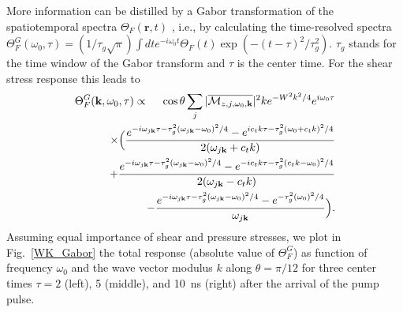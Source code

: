 \documentclass[aps,prb,twocolumn,superscriptaddress,floatfix]{revtex4}%
\def\ber{\begin{eqnarray}}
\def\eer{\end{eqnarray}}
\begin{document}
More information can be distilled by a  Gabor transformation of the spatiotemporal spectra $\Theta_F(\mathbf r,t)$ \cite{Hashimoto17}, i.e., by calculating the time-resolved spectra $\Theta^G_{F}(\omega_0,\tau)=(1/\tau_g \sqrt{\pi})\int dt e^{-i\omega_0 t}\Theta_{F}(t)\exp(-(t-\tau)^2/\tau_g^2)$. $\tau_g$ stands for the time window of the  Gabor transform and $\tau$ is the center time. For the shear stress response this leads to
\ber\Theta^G_{F}(\mathbf{k},\omega_0,\tau)	&\propto& 	\cos\theta\sum_{j}|\overline{{\cal M}_{z,j,\omega_0,\mathbf k}}|^2ke^{-W^{2}k^{2}/4}e^{i\omega_0\tau}\nonumber\\
&&\hspace{-1.5cm}	\times\Big(\frac{e^{-i\omega_{j\mathbf{k}}\tau-\tau_g^2(\omega_{j\mathbf{k}}-\omega_{0})^{2}/4}-e^{ic_{t}k\tau-\tau_g^2(\omega_{0}+c_{t}k)^{2}/4}}{2(\omega_{j\mathbf{k}}+c_{t}k)}\nonumber\\
&&\hspace{-1.5cm}+\frac{e^{-i\omega_{j\mathbf{k}}\tau-\tau_g^2(\omega_{j\mathbf{k}}-\omega_{0})^{2}/4}-e^{-ic_{t}k\tau-\tau_g^2(c_{t}k-\omega_{0})^{2}/4}}{2(\omega_{j\mathbf{k}}-c_{t}k)}\nonumber\\
&&\hspace{-1.5cm}-\frac{e^{-i\omega_{j\mathbf{k}}\tau-\tau_g^2(\omega_{j\mathbf{k}}-\omega_{0})^{2}/4}-e^{-\tau_g^2(\omega_{0})^{2}/4}}{\omega_{j\mathbf{k}}}\Big). \label{eq:Gabor}
\eer 
Assuming equal importance of shear and pressure stresses, we plot in Fig.~\ref{WK_Gabor} the total response (absolute value of $\Theta^G_F$) as function of frequency $\omega_0$ and the wave vector modulus $k$ along $\theta=\pi/12$ for three center times $\tau=2$ (left), 5 (middle), and 10~ns (right) after the arrival of the pump pulse. 
\end{document}
